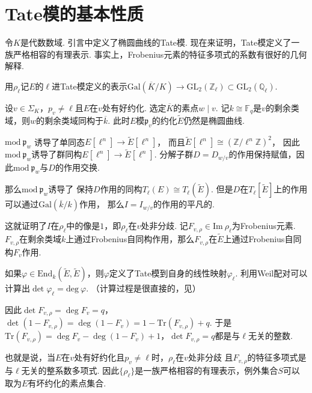 \section{Tate模的基本性质}

令$K$是代数数域.
引言中定义了椭圆曲线的Tate模.
现在来证明，Tate模定义了一族严格相容的有理表示. 事实上，Frobenius元素的特征多项式的系数有很好的几何解释.

用$\rho_{\ell}$记$E$的$\ell$进Tate模定义的表示$\mathrm{Gal}(\overline{K}/K)\to \mathrm{GL}_2(\mathbb{Z}_{\ell})\subset \mathrm{GL}_2(\mathbb{Q}_{\ell})$.

设$v\in \Sigma_K$，$p_v\neq \ell$且$E$在$v$处有好约化. 选定$\overline{K}$的素点$w\mid v$.
记$k\cong \mathbb{F}_q$是$v$的剩余类域，则$w$的剩余类域同构于$\overline{k}$.
此时$E$模$\mathfrak{p}_v$的约化$\tilde{E}$仍然是椭圆曲线.

$\mathrm{mod}\ \mathfrak{p}_{w}$
诱导了单同态$E[\ell^n]\to \tilde{E}[\ell^n]$，
而且$\tilde{E}[\ell^n]\cong (\mathbb{Z}/\ell^n \mathbb{Z})^2$，
因此$\mathrm{mod}\ \mathfrak{p}_{w}$诱导了群同构$E[\ell^n]\to \tilde{E}[\ell^n]$.
分解子群$D=D_{w/v}$的作用保持赋值，因此$\mathrm{mod}\ \mathfrak{p}_{w}$与$D$的作用交换.

那么$\mathrm{mod}\ \mathfrak{p}_{w}$诱导了
保持$D$作用的同构$T_{\ell}(E)\cong T_{\ell}(\tilde{E})$.
但是$D$在$T_{\ell}[\tilde{E}]$上的作用可以通过$\mathrm{Gal}(\overline{k}/k)$作用，
那么$I=I_{w/v}$的作用的平凡的.

这就证明了$I$在$\rho_{\ell}$中的像是$1$，即$\rho_{\ell}$在$v$处非分歧.
记$F_{v,\rho}\in \mathrm{Im}\ \rho_{\ell}$为Frobenius元素.
$F_{v,\rho}$在剩余类域$k$上通过Frobenius自同构作用，那么$F_{v,\rho}$在$\tilde{E}$上通过Frobenius自同构$F_v$作用.

如果$\varphi\in\mathrm{End}_{k}(\tilde{E}, \tilde{E})$，则$\varphi$定义了Tate模到自身的线性映射$\varphi_{\ell}$.
利用Weil配对可以计算出$\det \varphi_{\ell} = \mathrm{deg}\ \varphi$.
（计算过程是很直接的，见{\parencite[][p. 99]{silverman2009arithmetic}}）

因此$\det F_{v,\rho} = \deg F_v = q$，
$\det (1-F_{v,\rho}) = \deg (1-F_v) = 1 - \mathrm{Tr}(F_{v,\rho}) + q$.
于是$\mathrm{Tr}(F_{v,\rho}) = \deg F_v - \deg (1-F_v) + 1$，$\det F_{v,\rho} = q$都是与$\ell$无关的整数.

也就是说，当$E$在$v$处有好约化且$p_v\neq \ell$时，$\rho_{\ell}$在$v$处非分歧
且$F_{v,\rho}$的特征多项式是与$\ell$无关的整系数多项式.
因此$\{\rho_{\ell}\}$是一族严格相容的有理表示，例外集合$S$可以取为$E$有坏约化的素点集合.

